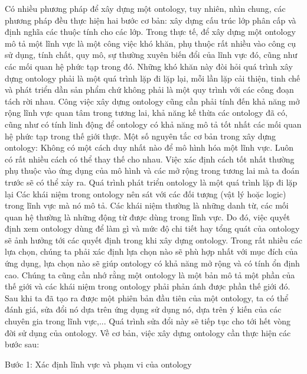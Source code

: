 Có nhiều phương pháp để xây dựng một ontology, tuy nhiên, nhìn chung, các phương pháp đều thực hiện hai bước cơ bản: xây dựng cấu trúc lớp phân cấp và định nghĩa các thuộc tính cho các lớp. Trong thực tế, để xây dựng một ontology mô tả một lĩnh vực là một công việc khó khăn, phụ thuộc rất nhiều vào công cụ sử dụng, tính chất, quy mô, sự thường xuyên biến đổi của lĩnh vực đó, cũng như các mối quan hệ phức tạp trong đó. Những khó khăn này đòi hỏi quá trình xây dựng ontology phải là một quá trình lặp đi lặp lại, mỗi lần lặp cải thiện, tinh chế và phát triển dần sản phẩm chứ không phải là một quy trình với các công đoạn tách rời nhau. Công việc xây dựng ontology cũng cần phải tính đến khả năng mở rộng lĩnh vực quan tâm trong tương lai, khả năng kế thừa các ontology đã có, cũng như có tính linh động để ontology có khả năng mô tả tốt nhất các mối quan hệ phức tạp trong thế giới thực. 
Một số nguyên tắc cơ bản trong xây dựng ontology:
Không có một cách duy nhất nào để mô hình hóa một lĩnh vực. Luôn có rất nhiều cách có thể thay thế cho nhau. Việc xác định cách tốt nhất thường phụ thuộc vào ứng dụng của mô hình và các mở rộng trong tương lai mà ta đoán trước sẽ có thể xảy ra.
Quá trình phát triển ontology là một quá trình lặp đi lặp lại
Các khái niệm trong ontology nên sát với các đối tượng (vật lý hoặc logic) trong lĩnh vực mà nó mô tả. Các khái niệm thường là những danh từ, các mối quan hệ thường là những động từ được dùng trong lĩnh vực.
Do đó, việc quyết định xem ontology dùng để làm gì và mức độ chi tiết hay tổng quát của ontology sẽ ảnh hưởng tới các quyết định trong khi xây dựng ontology. Trong rất nhiều các lựa chọn, chúng ta phải xác định lựa chọn nào sẽ phù hợp nhất với mục đích của ứng dụng, lựa chọn nào sẽ giúp ontology có khả năng mở rộng và có tính ổn định cao. Chúng ta cũng cần nhớ rằng một ontology là một bản mô tả một phần của thế giới và các khái niệm trong ontology phải phản ánh được phần thế giới đó. Sau khi ta đã tạo ra được một phiên bản đầu tiên của một ontology, ta có thể đánh giá, sửa đổi nó dựa trên ứng dụng sử dụng nó,  dựa trên ý kiến của các chuyên gia trong lĩnh vực,... Quá trình sửa đổi này sẽ tiếp tục cho tới hết vòng đời sử dụng của ontology.
Về cơ bản, việc xây dựng ontology cần thực hiện các bước sau:

Bước 1: Xác định lĩnh vực và phạm vi của ontology


